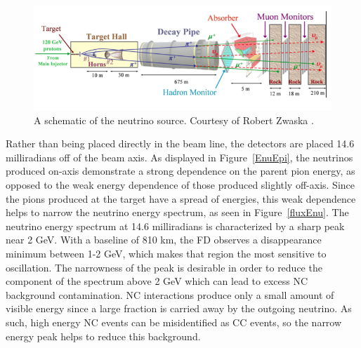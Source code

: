 \begin{figure}
  \begin{center}
    \includegraphics[width=\textwidth]{figures/figures/numi.png}
  \end{center}
  \caption[A schematic of the \numi neutrino source.]{A schematic of the \numi neutrino source.  Courtesy of Robert Zwaska \cite{zwaska2005thesis}.}
  \label{numi}
\end{figure}

Rather than being placed directly in the \numi beam line, the \nova detectors are placed 14.6 milliradians off of the beam axis.  As displayed in Figure~\ref{EnuEpi}, the neutrinos produced on-axis demonstrate a strong dependence on the parent pion energy, as opposed to the weak energy dependence of those produced slightly off-axis.  Since the pions produced at the target have a spread of energies, this weak dependence helps to narrow the neutrino energy spectrum, as seen in Figure~\ref{fluxEnu}.  The neutrino energy spectrum at 14.6 milliradians is characterized by a sharp peak near 2 GeV.
With a baseline of 810 km, the \nova FD observes a \numu
disappearance minimum between 1-2 GeV, which makes that region the most
sensitive to oscillation.
The narrowness of the peak is desirable in order to reduce the component
of the spectrum above 2 GeV which can lead to excess NC background
contamination.
NC interactions produce only a small amount of visible energy since a large
fraction is carried away by the outgoing neutrino.
As such, high energy NC events can be misidentified as CC events, so the narrow
energy peak helps to reduce this background.

